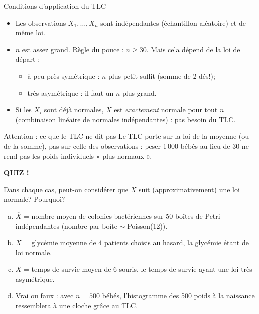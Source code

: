 \documentclass{BeamerTemplate}
\begin{document}
\begin{frame}[t]{Conditions d'application du TLC}
  \begin{itemize}\itemsep 1mm
    \item Les observations $X_1, \ldots, X_n$ sont \alert{indépendantes}
      (échantillon aléatoire) et de \alert{même loi}.
    \item $n$ est \alert{assez grand}. Règle du pouce : $n \ge 30$. Mais cela
      dépend de la loi de départ :
      \begin{itemize}\small
        \item à peu près symétrique : $n$ plus petit suffit (somme de 2 dés!);
        \item très asymétrique : il faut un $n$ plus grand.
      \end{itemize}
    \item Si les $X_i$ sont déjà \alert{normales}, $\overline{X}$ est
      \emph{exactement} normale pour tout $n$ (combinaison linéaire de normales
      indépendantes) : pas besoin du TLC.
  \end{itemize}

  \vspace{-2mm}
  \begin{Boite}{Attention : ce que le TLC ne dit pas}
    \small Le TLC porte sur la loi de la \alert{moyenne} (ou de la somme), pas sur
    celle des observations : peser 1\,000 bébés au lieu de 30 ne rend pas
    les poids individuels « plus normaux ».
  \end{Boite}
\end{frame}

\begin{frame}[plain,t]
  \centerline{\LARGE\bfseries\alert{QUIZ !}}

  \medskip
  Dans chaque cas, peut-on considérer que $\overline{X}$ suit
  (approximativement) une loi normale? Pourquoi?
  \begin{enumerate}[a)]\itemsep 5mm
    \item $\overline{X}$ = nombre moyen de colonies bactériennes sur 50 boîtes
      de Petri indépendantes (nombre par boîte $\sim$ Poisson(12)).
    \item $\overline{X}$ = glycémie moyenne de 4 patients choisis au hasard,
      la glycémie étant de loi normale.
    \item $\overline{X}$ = temps de survie moyen de 6 souris, le temps de
      survie ayant une loi très asymétrique.
    \item Vrai ou faux : avec $n = 500$ bébés, l'histogramme des 500 poids à
      la naissance ressemblera à une cloche grâce au TLC.
  \end{enumerate}
\end{frame}
\end{document}
